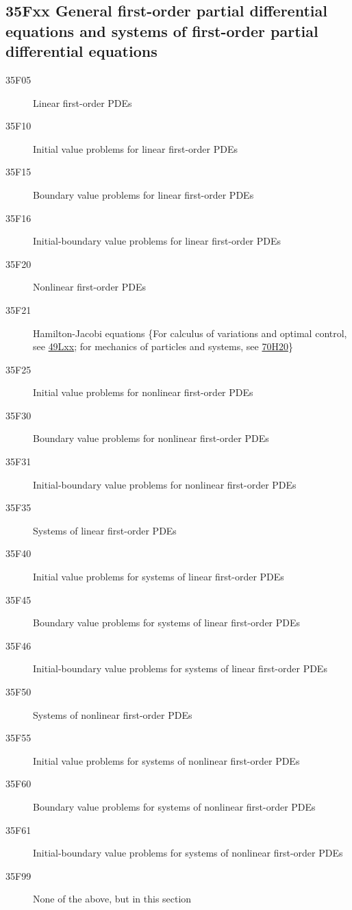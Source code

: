 \subsection*{35Fxx  General first-order partial differential equations and systems of first-order partial differential equations}\label{35Fxx}
\begin{description}  
\item [35F05]\label{35F05} Linear first-order PDEs
\item [35F10]\label{35F10} Initial value problems for linear first-order PDEs
\item [35F15]\label{35F15} Boundary value problems for linear first-order PDEs
\item [35F16]\label{35F16} Initial-boundary value problems for linear first-order PDEs
\item [35F20]\label{35F20} Nonlinear first-order PDEs
\item [35F21]\label{35F21} Hamilton-Jacobi equations \{For calculus of variations and optimal control, see \hyperref[49Lxx]{49Lxx}; for mechanics of particles and systems, see \hyperref[70H20]{70H20}\}
\item [35F25]\label{35F25} Initial value problems for nonlinear first-order PDEs
\item [35F30]\label{35F30} Boundary value problems for nonlinear first-order PDEs
\item [35F31]\label{35F31} Initial-boundary value problems for nonlinear first-order PDEs
\item [35F35]\label{35F35} Systems  of linear first-order PDEs
\item [35F40]\label{35F40} Initial value problems for  systems  of linear first-order PDEs
\item [35F45]\label{35F45} Boundary value problems for systems of linear first-order PDEs
\item [35F46]\label{35F46} Initial-boundary value problems for systems of linear first-order PDEs
\item [35F50]\label{35F50} Systems  of nonlinear first-order PDEs
\item [35F55]\label{35F55} Initial value problems for systems of nonlinear first-order PDEs
\item [35F60]\label{35F60} Boundary value problems for systems of nonlinear first-order PDEs
\item [35F61]\label{35F61} Initial-boundary value problems for systems of nonlinear first-order PDEs 
\item [35F99]\label{35F99} None of the above, but in this section
\end{description}
